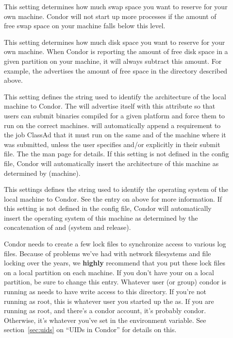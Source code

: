 \begin{description}
\item[] \label{param:ReservedSwap} This setting
  determines how much swap space you want to reserve for your own
  machine.  Condor will not start up more  processes if
  the amount of free swap space on your machine falls below this
  level. 

\item[] \label{param:ReservedDisk} This setting
  determines how much disk space you want to reserve for your own
  machine.  When Condor is reporting the amount of free disk space in
  a given partition on your machine, it will always subtract this
  amount.  For example, the  advertises the amount of
  free space in the  directory described above.
  
\item[] \label{param:Arch} This setting defines the string
  used to identify the architecture of the local machine to Condor.
  The  will advertise itself with this attribute so
  that users can submit binaries compiled for a given platform and
  force them to run on the correct machines.   will
  automatically append a requirement to the job ClassAd that it must
  run on the same  and  of the machine where
  it was submitted, unless the user specifies  and/or
   explicitly in their submit file.  The the
   man page for details.  If this setting is
  not defined in the config file, Condor will automatically insert the
  architecture of this machine as determined by 
  (machine).

\item[] \label{param:OpSys} This settings defines the
  string used to identify the operating system of the local machine to
  Condor.  See the entry on  above for more information.
  If this setting is not defined in the config file, Condor will
  automatically insert the operating system of this machine as
  determined by the concatenation of  and  (system and release).
  
\item[] \label{param:Lock} Condor needs to create a few
  lock files to synchronize access to various log files.  Because of
  problems we've had with network filesystems and file locking over
  the years, we \textbf{highly} recommend that you put these lock
  files on a local partition on each machine.  If you don't have your
   on a local partition, be sure to change this
  entry.  Whatever user (or group) condor is running as needs to have
  write access to this directory.  If you're not running as root, this
  is whatever user you started up the  as.  If you are
  running as root, and there's a condor account, it's probably condor.
  Otherwise, it's whatever you've set in the 
  environment variable.  See section~\ref{sec:uids} on ``UIDs in
  Condor'' for details on this.


\end{description}
